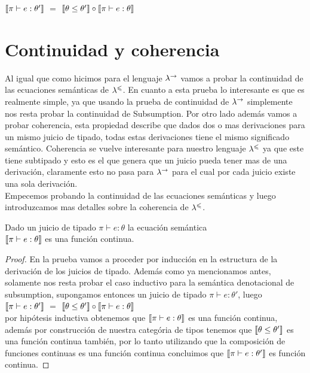 $\llbracket \pi \vdash e : \theta' \rrbracket$ $=$ $\llbracket \theta \leq \theta' \rrbracket \circ \llbracket \pi \vdash e : \theta \rrbracket$

\section{Continuidad y coherencia}

Al igual que como hicimos para el lenguaje $\lambda^{\rightarrow}$ vamos a probar la
continuidad de las ecuaciones sem\'anticas de $\lambda^{\leqslant}$. En cuanto a 
esta prueba lo interesante es que es realmente simple, ya que usando la 
prueba de continuidad de $\lambda^{\rightarrow}$ simplemente nos resta probar 
la continuidad de Subsumption. Por otro lado adem\'as vamos a probar coherencia,
esta propiedad describe que dados dos o mas derivaciones para un mismo
juicio de tipado, todas estas derivaciones tiene el mismo significado
sem\'antico. Coherencia se vuelve interesante para nuestro lenguaje $\lambda^{\leqslant}$
ya que este tiene subtipado y esto es el que genera que un juicio pueda
tener mas de una derivaci\'on, claramente esto no pasa para $\lambda^{\rightarrow}$ para
el cual por cada juicio existe una sola derivaci\'on.\\

Empecemos probando la continuidad de las ecuaciones sem\'anticas y luego
introduzcamos mas detalles sobre la coherencia de $\lambda^{\leqslant}$.

\begin{theorem}

Dado un juicio de tipado $\pi \vdash e : \theta$ la ecuaci\'on sem\'antica
\\ 
$\llbracket \pi \vdash e : \theta \rrbracket$ es una funci\'on continua.

\end{theorem}

\begin{proof}

En la prueba vamos a proceder por inducci\'on en la estructura de la derivaci\'on 
de los juicios de tipado. Adem\'as como ya mencionamos antes, solamente nos resta
probar el caso inductivo para la sem\'antica denotacional de subsumption, supongamos
entonces un juicio de tipado $\pi \vdash e : \theta'$, luego\\

$\llbracket \pi \vdash e : \theta' \rrbracket$ $=$ $\llbracket \theta \leq \theta' \rrbracket \circ \llbracket \pi \vdash e : \theta \rrbracket$\\

por hip\'otesis inductiva obtenemos que $\llbracket \pi \vdash e : \theta \rrbracket$ es una funci\'on
continua, adem\'as por construcci\'on de nuestra categ\'oria de tipos
tenemos que $\llbracket \theta \leq \theta' \rrbracket$ es una funci\'on continua tambi\'en, 
por lo tanto utilizando que la composici\'on de funciones continuas es una funci\'on
continua concluimos que $\llbracket \pi \vdash e : \theta' \rrbracket$ es funci\'on continua.

\end{proof}

